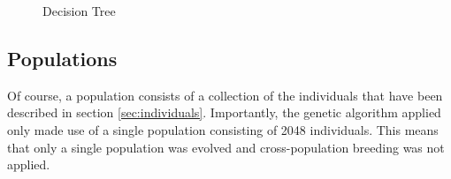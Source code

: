 \begin{figure}[H]
    \centering
    \caption{Decision Tree}
    \label{fig:decision_tree}
\end{figure}

\subsection{Populations}
Of course, a population consists of a collection of the individuals that have been described in section \ref{sec:individuals}. Importantly, the genetic algorithm applied only made use of a single population consisting of 2048 individuals. This means that only a single population was evolved and cross-population breeding was not applied.

